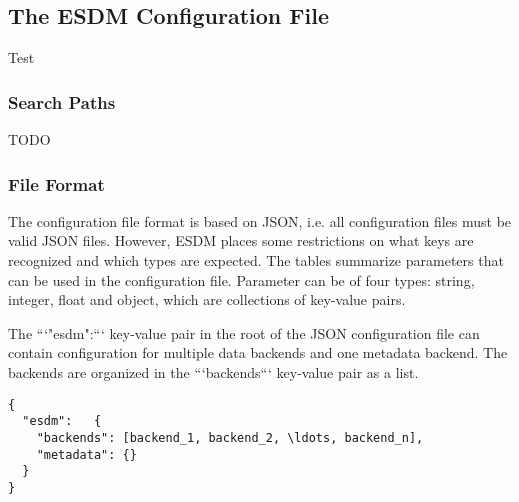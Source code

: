 \subsection{The ESDM Configuration File}

Test

\subsubsection{Search Paths}

TODO

\subsubsection{File Format}

The configuration file format is based on JSON, i.e. all configuration files must be valid JSON files.
However, ESDM places some restrictions on what keys are recognized and which types are expected.
The tables summarize parameters that can be used in the configuration file.
Parameter can be of four types: string, integer, float and object, which are collections of key-value pairs.

The ```"esdm":{}``` key-value pair in the root of the JSON configuration file can contain configuration for multiple data backends and one metadata backend.
The backends are organized in the ```backends``` key-value pair as a list.

\begin{lstlisting}
{
  "esdm":	{
    "backends": [backend_1, backend_2, \ldots, backend_n],
    "metadata": {}
  }
}
\end{lstlisting}



